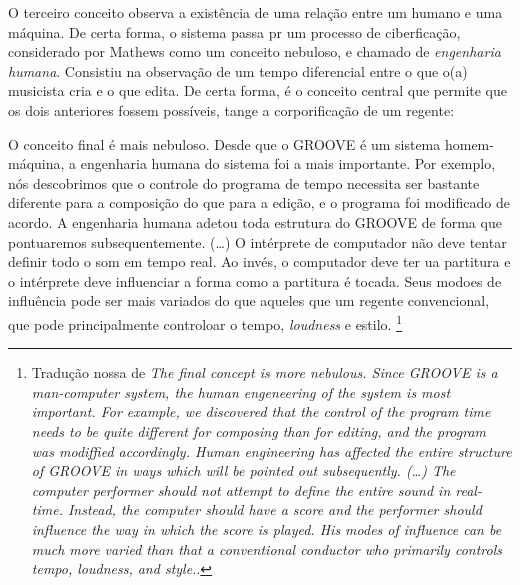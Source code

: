 O terceiro conceito observa a existência de uma relação entre um humano e uma máquina. De certa forma, o sistema passa pr um  processo de ciberficação, considerado por Mathews como um conceito nebuloso, e chamado de \emph{engenharia humana}. Consistiu na observação de um tempo diferencial entre o que o(a) musicista cria e o que edita. De certa forma, é o conceito central que permite que os dois anteriores fossem possíveis, tange a corporificação de um regente:

\begin{citacao} 
O conceito final é mais nebuloso. Desde que o GROOVE é um sistema homem-máquina, a engenharia humana do sistema foi a mais importante. Por exemplo, nós descobrimos que o controle do programa de tempo necessita ser bastante diferente para a composição do que para a edição, e o programa foi modificado de acordo. A engenharia humana adetou toda estrutura do GROOVE de forma que pontuaremos subsequentemente. (\ldots) O intérprete de computador não deve tentar definir todo o som em tempo real. Ao invés, o computador deve ter ua partitura e o intérprete deve influenciar a forma como a partitura é tocada. Seus modoes de influência pode ser mais variados do que aqueles que um regente convencional, que pode principalmente controloar o tempo, \emph{loudness} e estilo.\cite[p.~715-716]{mathews_groove_1970}
\footnote{Tradução nossa de \emph{The final concept is more nebulous. Since GROOVE is a man-computer system, the human engeneering of the system is most important. For example, we discovered that the control of the program time needs to be quite different for composing than for editing, and the program was modiffied accordingly. Human engineering has affected the entire structure of GROOVE in ways which will be pointed out subsequently. (\ldots) The computer performer should not attempt to define the entire sound in real-time. Instead, the computer should have a score and the performer should influence the way in which the score is played. His modes of influence can be much more varied than that a conventional conductor who primarily controls tempo, loudness, and style.}.}
\end{citacao}

